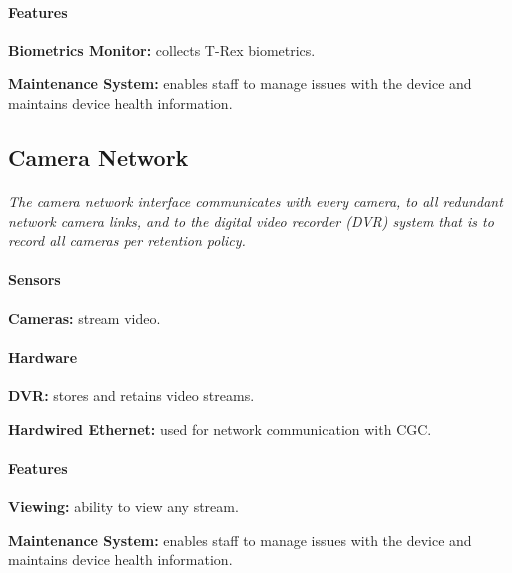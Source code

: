 \documentclass[12pt]{article}
\begin{document}
    \paragraph{Features}
    \begin{list}{}{}
        \item \textbf{Biometrics Monitor:} collects T-Rex biometrics.
        \item \textbf{Maintenance System:} enables staff to manage issues with the device    
        and maintains device health information.
    \end{list}

    \subsection{Camera Network}
    \paragraph{} \textit{The camera network interface communicates with every camera, to 
    all redundant network camera links, and to the digital video recorder (DVR) system 
    that is to record all cameras per retention policy.}        
    
    \paragraph{Sensors}
    \begin{list}{}{}
        \item \textbf{Cameras:} stream video.
    \end{list}
        
    \paragraph{Hardware}
    \begin{list}{}{}
        \item \textbf{DVR:} stores and retains video streams.
        \item \textbf{Hardwired Ethernet:} used for network communication with CGC. 
    \end{list}
    
    \paragraph{Features}
    \begin{list}{}{}
        \item \textbf{Viewing:} ability to view any stream.
        \item \textbf{Maintenance System:} enables staff to manage issues with the device    
        and maintains device health information.
    \end{list}
\end{document}

